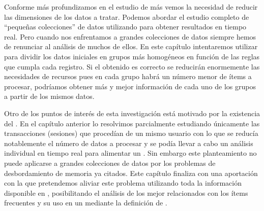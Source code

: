 Conforme más profundizamos en el estudio de \ARs más vemos la necesidad de reducir las dimensiones de los datos a tratar. Podemos abordar el estudio completo de "`pequeñas colecciones"' de datos utilizando \apriori para obtener resultados en tiempo real. Pero cuando nos enfrentamos a grandes colecciones de datos siempre hemos de renunciar al análisis de muchos de ellos. En este capítulo intentaremos utilizar \apriori para dividir los datos iniciales en grupos más homogéneos en función de las reglas que cumpla cada registro. Si el \clustering obtenido es correcto se reducirán enormemente las necesidades de recursos pues en cada grupo habrá un número menor de ítems a procesar, podríamos obtener más y mejor información de cada uno de los grupos a partir de los mismos datos.

Otro de los puntos de interés de esta investigación está motivado por la existencia del \dilemaIR. En el capítulo anterior lo resolvimos parcialmente estudiando únicamente las transacciones (sesiones) que procedían de un mismo usuario con lo que se reducía notablemente el número de datos a procesar y se podía llevar a cabo un análisis individual en tiempo real para alimentar un \SRW. Sin embargo este planteamiento no puede aplicarse a grandes colecciones de datos por los problemas de desbordamiento de memoria ya citados. Este capítulo finaliza con una aportación con la que pretendemos aliviar este problema utilizando toda la información disponible en \D, posibilitando el análisis de los \irs mejor relacionados con los ítems frecuentes y su uso en un \SR mediante la definición de \ROPs.

